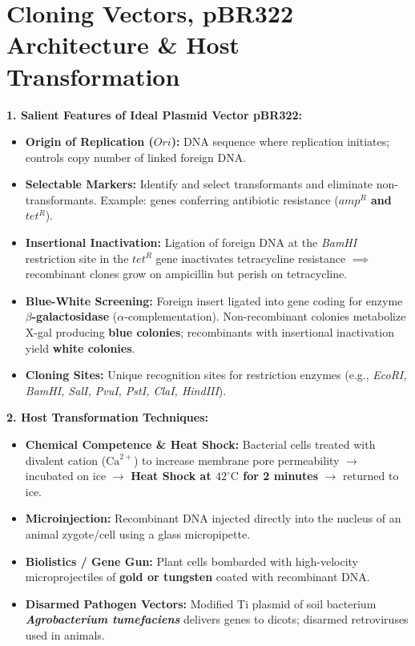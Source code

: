 \documentclass[10pt,twoside,openright]{book}
\begin{document}
\section{Cloning Vectors, pBR322 Architecture \& Host Transformation}

\begin{conceptbox}
\textbf{1. Salient Features of Ideal Plasmid Vector pBR322:}
\begin{itemize}[leftmargin=*]
  \item \textbf{Origin of Replication ($Ori$):} DNA sequence where replication initiates; controls copy number of linked foreign DNA.
  \item \textbf{Selectable Markers:} Identify and select transformants and eliminate non-transformants. Example: genes conferring antibiotic resistance (\textbf{$amp^R$ and $tet^R$}).
  \item \textbf{Insertional Inactivation:} Ligation of foreign DNA at the \textit{BamHI} restriction site in the $tet^R$ gene inactivates tetracycline resistance $\implies$ recombinant clones grow on ampicillin but perish on tetracycline.
  \item \textbf{Blue-White Screening:} Foreign insert ligated into gene coding for enzyme \textbf{$\beta$-galactosidase} ($\alpha$-complementation). Non-recombinant colonies metabolize X-gal producing \textbf{blue colonies}; recombinants with insertional inactivation yield \textbf{white colonies}.
  \item \textbf{Cloning Sites:} Unique recognition sites for restriction enzymes (e.g., \textit{EcoRI, BamHI, SalI, PvuI, PstI, ClaI, HindIII}).
\end{itemize}

\textbf{2. Host Transformation Techniques:}
\begin{itemize}[leftmargin=*]
  \item \textbf{Chemical Competence \& Heat Shock:} Bacterial cells treated with divalent cation ($\mathrm{Ca}^{2+}$) to increase membrane pore permeability $\to$ incubated on ice $\to$ \textbf{Heat Shock at $42^\circ\mathrm{C}$ for 2 minutes} $\to$ returned to ice.
  \item \textbf{Microinjection:} Recombinant DNA injected directly into the nucleus of an animal zygote/cell using a glass micropipette.
  \item \textbf{Biolistics / Gene Gun:} Plant cells bombarded with high-velocity microprojectiles of \textbf{gold or tungsten} coated with recombinant DNA.
  \item \textbf{Disarmed Pathogen Vectors:} Modified Ti plasmid of soil bacterium \textbf{\textit{Agrobacterium tumefaciens}} delivers genes to dicots; disarmed retroviruses used in animals.
\end{itemize}
\end{conceptbox}
\end{document}
